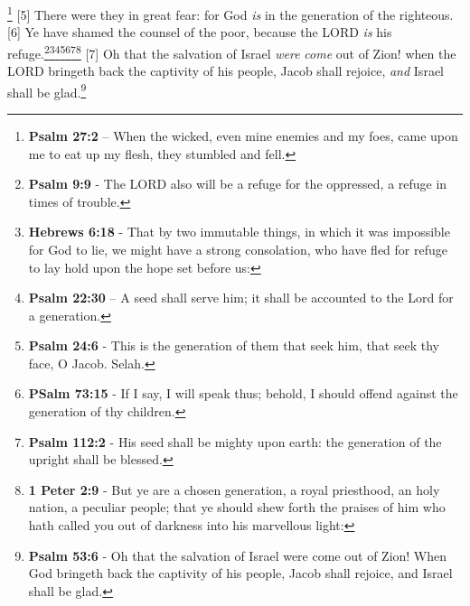 \footnote{\textbf{Psalm 27:2} -- When the wicked, even mine enemies and my foes, came upon me to eat up my flesh, they stumbled and fell.}
[5] \textcolor[cmyk]{0.99998,1,0,0}{There were they in great fear: for God \emph{is} in the generation of the righteous.}
[6] \textcolor[cmyk]{0.99998,1,0,0}{Ye have shamed the counsel of the poor, because the LORD \emph{is} his refuge.}\footnote{\textbf{Psalm 9:9} - The LORD also will be a refuge for the oppressed, a refuge in times of trouble.}\footnote{\textbf{Hebrews 6:18} - That by two immutable things, in which it was impossible for God to lie, we might have a strong consolation, who have fled for refuge to lay hold upon the hope set before us:}\footnote{\textbf{Psalm 22:30} -- A seed shall serve him; it shall be accounted to the Lord for a generation.}\footnote{\textbf{Psalm 24:6} - This is the generation of them that seek him, that seek thy face, O Jacob. Selah.}\footnote{\textbf{PSalm 73:15} - If I say, I will speak thus; behold, I should offend against the generation of thy children.}\footnote{\textbf{Psalm 112:2} - His seed shall be mighty upon earth: the generation of the upright shall be blessed.}\footnote{\textbf{1 Peter 2:9} - But ye are a chosen generation, a royal priesthood, an holy nation, a peculiar people; that ye should shew forth the praises of him who hath called you out of darkness into his marvellous light:}
[7] \textcolor[cmyk]{0.99998,1,0,0}{Oh that the salvation of Israel \emph{were} \emph{come} out of Zion! when the LORD bringeth back the captivity of his people, Jacob shall rejoice, \emph{and} Israel shall be glad.}\footnote{\textbf{Psalm 53:6} - Oh that the salvation of Israel were come out of Zion! When God bringeth back the captivity of his people, Jacob shall rejoice, and Israel shall be glad.}
